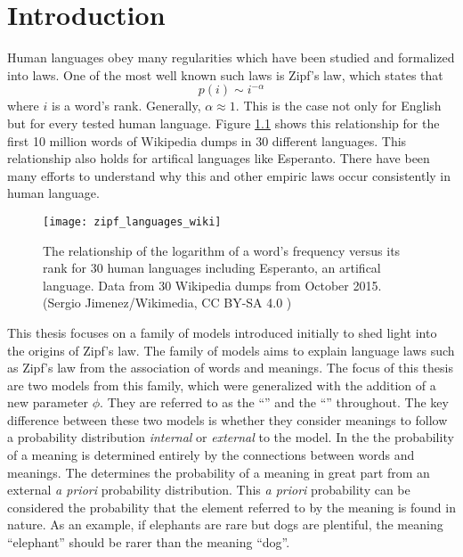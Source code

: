 \chapter{Introduction}
\label{cha:introduction}


Human languages obey many regularities which have been studied and formalized into laws.
One of the most well known such laws is Zipf's law, which states that
\begin{equation}
  \label{eq:zipf_law}
  p(i) \sim i^{-\alpha}
\end{equation}
where $i$ is a word's rank.
Generally, $\alpha \approx 1$. \cite{Zipf1949a}
This is the case not only for English but for every tested human language. \cite{Mehri2017}
Figure \ref{fig:zipf_languages_wiki} shows this relationship for the first 10 million words of Wikipedia dumps in 30 different languages.
This relationship also holds for artifical languages like Esperanto.
There have been many efforts to understand why this and other empiric laws occur consistently in human language.

\begin{figure}
  \centering
  \texttt{[image: zipf\_languages\_wiki]}
  \caption{
    The relationship of the logarithm of a word's frequency versus its rank for 30 human languages including Esperanto, an artifical language.
    Data from 30 Wikipedia dumps from October 2015.\\
    (Sergio Jimenez/Wikimedia, CC BY-SA 4.0 \cite{Jimenez2015a})}
  \label{fig:zipf_languages_wiki}
\end{figure}


This thesis focuses on a family of models \cite{Ferrer2007a} introduced initially to shed light into the origins of Zipf's law. \cite{Ferrer2005a} \cite{Ferrer2003a}
The family of models aims to explain language laws such as Zipf's law from the association of words and meanings.
The focus of this thesis are two models from this family, which were generalized with the addition of a new parameter $\phi$. \cite{Ferrer2018a}
They are referred to as the ``\firstmodel{}'' and the ``\secondmodel{}'' throughout.
The key difference between these two models is whether they consider meanings to follow a probability distribution \emph{internal} or \emph{external} to the model.
In the \firstmodel{} the probability of a meaning is determined entirely by the connections between words and meanings.
The \secondmodel{} determines the probability of a meaning in great part from an external \emph{a priori} probability distribution.
This \emph{a priori} probability can be considered the probability that the element referred to by the meaning is found in nature.
As an example, if elephants are rare but dogs are plentiful, the meaning ``elephant'' should be rarer than the meaning ``dog''.

